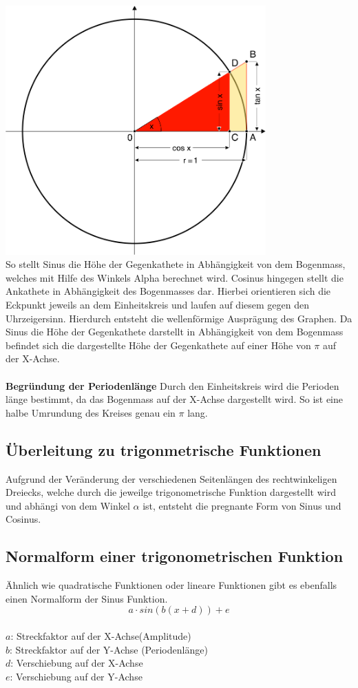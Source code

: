 \includegraphics[width=10cm]{Media/Winkelfunktionen_Einheitskreis}\\
So stellt Sinus die Höhe der Gegenkathete in Abhängigkeit von dem Bogenmass, welches mit Hilfe des
Winkels Alpha berechnet wird. Cosinus hingegen stellt die Ankathete in Abhängigkeit des Bogenmasses dar. Hierbei orientieren sich die Eckpunkt jeweils an dem Einheitskreis und laufen auf 
diesem gegen den Uhrzeigersinn. Hierdurch entsteht die wellenförmige Ausprägung des Graphen. Da Sinus die Höhe der Gegenkathete darstellt in Abhängigkeit von dem Bogenmass befindet sich die
dargestellte Höhe der Gegenkathete auf einer Höhe von $\pi$ auf der X-Achse. 
\\
\\
\textbf{Begründung der Periodenlänge}
Durch den Einheitskreis wird die Perioden länge bestimmt, da das Bogenmass auf der X-Achse dargestellt wird. So ist eine halbe Umrundung des Kreises genau ein $\pi$ lang. 


\subsection{Überleitung zu trigonmetrische Funktionen}
Aufgrund der Veränderung der verschiedenen Seitenlängen des rechtwinkeligen Dreiecks, welche durch die jeweilge trigonometrische Funktion dargestellt wird und abhängi
von dem Winkel $\alpha$ ist, entsteht die pregnante Form von Sinus und Cosinus. 
\\


\subsection{Normalform einer trigonometrischen Funktion}
Ähnlich wie quadratische Funktionen oder lineare Funktionen gibt es ebenfalls einen Normalform der Sinus Funktion.
\[a\cdot sin(b(x+d))+e\]
\\
$a$: Streckfaktor auf der X-Achse(Amplitude) \\
$b$: Streckfaktor auf der Y-Achse (Periodenlänge)\\
$d$: Verschiebung auf der X-Achse\\
$e$: Verschiebung auf der Y-Achse \\
	\pagebreak
	
